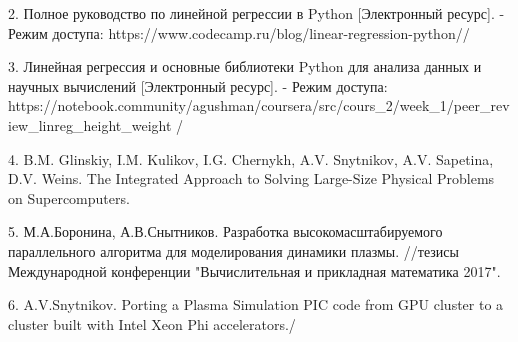 \documentclass{article}
\begin{document}
2. Полное руководство по линейной регрессии в Python [Электронный ресурс].
   - Режим доступа: https://www.codecamp.ru/blog/linear-regression-python//

3. Линейная регрессия и основные библиотеки Python для анализа данных и научных вычислений [Электронный ресурс].
   - Режим доступа: https://notebook.community/agushman/coursera/src/cours_2/week_1/peer_review_linreg_height_weight /

4. B.M. Glinskiy, I.M. Kulikov, I.G. Chernykh, A.V. Snytnikov, A.V. Sapetina, D.V. Weins.  The Integrated Approach to Solving Large-Size Physical Problems on Supercomputers.

5. М.А.Боронина, А.В.Снытников. Разработка высокомасштабируемого параллельного алгоритма для моделирования динамики плазмы.
   //тезисы Международной конференции "Вычислительная и прикладная математика 2017".

6. A.V.Snytnikov.  Porting a Plasma Simulation PIC code from GPU cluster to a cluster built with Intel Xeon Phi accelerators./
\end{document}
